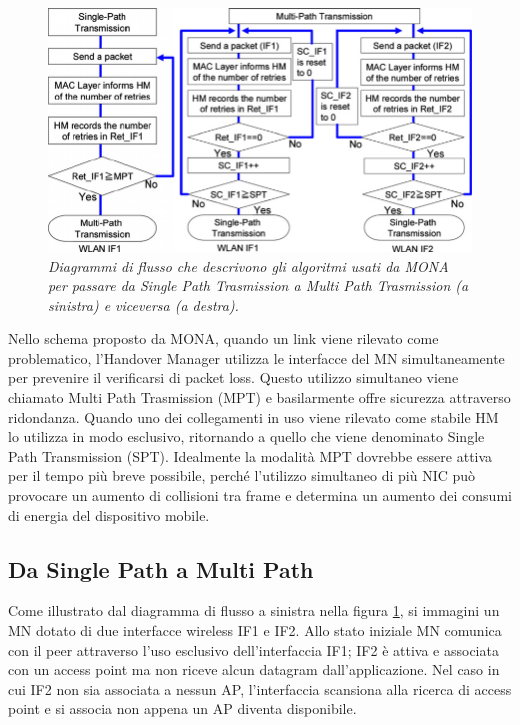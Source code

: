 \documentclass[12pt,a4paper,openright,twoside]{book}
\begin{document}
\begin{figure}[tb]
\centering
\includegraphics[width=\textwidth]{img/mona-sp-mp}
\caption{\em Diagrammi di flusso che descrivono gli algoritmi usati da
  MONA per passare da Single Path Trasmission a Multi Path Trasmission
  (a sinistra) e viceversa (a destra).}
\label{fig:mona:sp-mp}
\end{figure}

Nello schema proposto da MONA, quando un link viene rilevato come
problematico, l'Handover Manager utilizza le interfacce del MN
simultaneamente per prevenire il verificarsi di packet loss. Questo
utilizzo simultaneo viene chiamato Multi Path Trasmission (MPT) e
basilarmente offre sicurezza attraverso ridondanza. Quando uno dei
collegamenti in uso viene rilevato come stabile HM lo utilizza in modo
esclusivo, ritornando a quello che viene denominato Single Path
Transmission (SPT). Idealmente la modalità MPT dovrebbe essere attiva
per il tempo più breve possibile, perché l'utilizzo simultaneo di più
NIC può provocare un aumento di collisioni tra frame e determina un
aumento dei consumi di energia del dispositivo mobile.

\subsection{Da Single Path a Multi Path}

Come illustrato dal diagramma di flusso a sinistra nella figura
\ref{fig:mona:sp-mp}, si immagini un MN dotato di due interfacce
wireless IF1 e IF2. Allo stato iniziale MN comunica con il peer
attraverso l'uso esclusivo dell'interfaccia IF1; IF2 è attiva e
associata con un access point ma non riceve alcun datagram
dall'applicazione. Nel caso in cui IF2 non sia associata a nessun AP,
l'interfaccia scansiona alla ricerca di access point e si associa non
appena un AP diventa disponibile.
\end{document}
